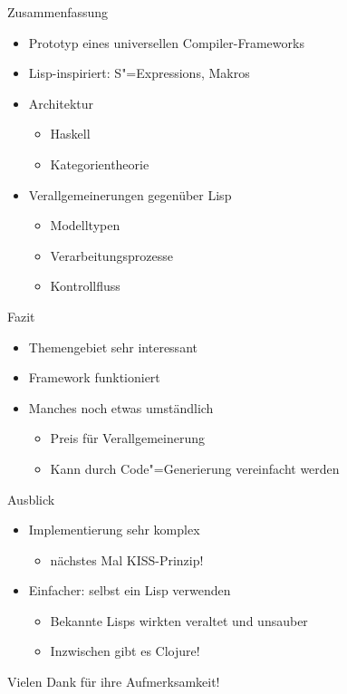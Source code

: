 \documentclass{beamer}
\newcommand{\pfeil}{\item[$\Rightarrow$]}
\newcommand{\sexps}{S"=Expressions}
\newcommand{\cgen}{Code"=Generierung}
\begin{document}
\begin{frame}{Zusammenfassung}
  \begin{itemize}
  \item Prototyp eines universellen Compiler-Frameworks
  \item Lisp-inspiriert: \sexps{}, Makros
  \item Architektur
    \begin{itemize}
    \item Haskell
    \item Kategorientheorie
    \end{itemize}
  \item Verallgemeinerungen gegenüber Lisp
    \begin{itemize}
    \item Modelltypen
    \item Verarbeitungsprozesse
    \item Kontrollfluss
    \end{itemize}
  \end{itemize}
\end{frame}

\begin{frame}{Fazit}
  \begin{itemize}
  \item Themengebiet sehr interessant
  \item Framework funktioniert
  \item Manches noch etwas umständlich
    \begin{itemize}
    \item Preis für Verallgemeinerung
    \item Kann durch \cgen{} vereinfacht werden
    \end{itemize}
  \end{itemize}
\end{frame}

\begin{frame}{Ausblick}
  \begin{itemize}
  \item Implementierung sehr komplex
    \begin{itemize}
    \pfeil nächstes Mal KISS-Prinzip!
    \end{itemize}
  \item Einfacher: selbst ein Lisp verwenden
    \begin{itemize}
    \item Bekannte Lisps wirkten veraltet und unsauber
    \item Inzwischen gibt es Clojure!
    \end{itemize}
  \end{itemize}
\end{frame}

\begin{frame}
  \begin{center}
    \Huge Vielen Dank für ihre Aufmerksamkeit!
  \end{center}
\end{frame}
\end{document}
